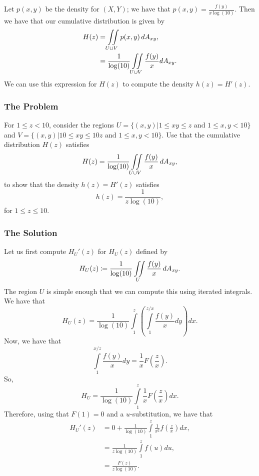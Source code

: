 Let \(p(x,y)\) be the density for \((X, Y)\); we have that \(p(x,y) = \frac{f(y)}{x\log(10)}\). Then we have that our cumulative distribution is given by
\begin{align}
H(z) & = \iint\limits_{U\cup V} p(x,y) \, dA_{xy}, \\ 
& = \frac{1}{\log(10)} \iint \limits_{U\cup V} \frac{f(y)}{x}  dA_{xy}.
\end{align}
We can use this expression for \(H(z)\) to compute the density \(h(z) = H'(z)\).

\subsubsection*{The Problem}

For \(1 \leq z < 10\), consider the regions \(U = \{(x, y) | 1 \leq xy \leq z \text{ and } 1 \leq x, y < 10 \}\) and \(V = \{(x, y) | 10 \leq xy \leq 10z \text{ and } 1 \leq x, y < 10\}\). Use that the
cumulative distribution \(H(z)\) satisfies 
\begin{equation}
H(z) = \frac{1}{\log(10)} \iint\limits_{U \cup V} \frac{f(y)}{x} \, dA_{xy}, 
\end{equation}
to show that the density \(h(z) = H'(z)\) satisfies
\begin{equation}
h(z) = \frac{1}{z\log(10)},
\end{equation}
for \(1 \leq z \leq 10\).

\subsubsection*{The Solution}

Let us first compute \(H_U'(z)\) for \(H_U(z)\) defined by
\begin{equation}
H_U(z) \coloneqq \frac{1}{\log(10)} \iint\limits_U \frac{f(y)}{x}\, dA_{xy}. 
\end{equation}
The region \(U\) is simple enough that we can compute this using iterated integrals. We have that
\begin{equation}
H_U(z) = \frac{1}{\log(10)}\int\limits_{1}^{z} \left( \int\limits_{1}^{z/x} \frac{f(y)}{x} dy\right) dx. 
\end{equation}
Now, we have that
\begin{equation}
\int\limits_{1}^{x/z} \frac{f(y)}{x} dy = \frac{1}{x} F\left(\frac{z}{x}\right).
\end{equation}
So,
\begin{equation}
H_U = \frac{1}{\log(10)}\int\limits_1^z \frac{1}{x} F\left(\frac{z}{x}\right) dx. 
\end{equation}
Therefore, using that \(F(1) = 0\) and a \(u\)-substitution, we have that
\begin{align}
H_U'(z) & = 0 + \frac{1}{\log(10)} \int\limits_1^z \frac{1}{x^2} f\left(\frac{z}{x}\right) dx, \\ 
    & = \frac{1}{z\log(10)} \int\limits_1^{z} f(u) du, \\
& = \frac{F(z)}{z\log(10)}.
\end{align}

